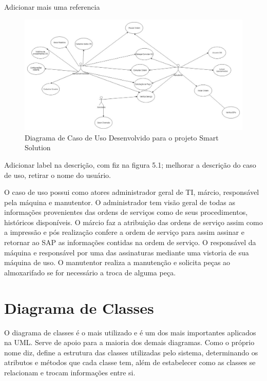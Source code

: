  {\color{red}Adicionar mais uma referencia}
 
\begin{figure}[H]
	\caption{\label{novocasodeusointegra}Diagrama de Caso de Uso Desenvolvido para o projeto Smart Solution}
	\begin{center}
		\includegraphics[scale=0.90,angle=90]{./Figuras/novocasodeusointegra}
		
	\end{center}
\end{figure}

\newpage
{\color{red}Adicionar label na descrição, com fiz na figura 5.1; melhorar a descrição do caso de uso, retirar o nome do usuário.


}

O caso de uso possui como atores administrador geral de TI, márcio, responsável pela máquina e manutentor. O administrador tem visão geral de todas as informações provenientes das ordens de serviços como de seus procedimentos, históricos disponíveis. O márcio faz a atribuição das ordens de serviço assim como a impressão e pós realização confere a ordem de serviço para assim assinar e retornar ao SAP as informações contidas na ordem de serviço. O responsável da máquina e responsável por uma das assinaturas mediante uma vistoria de sua máquina de uso. O manutentor realiza a manutenção e solicita peças ao almoxarifado se for necessário a troca de alguma peça.



\section{Diagrama de Classes}
O diagrama de classes é o mais utilizado e é um dos mais importantes aplicados na UML. Serve de apoio para a maioria dos demais diagramas. Como o próprio nome diz, define a estrutura das classes utilizadas pelo sistema, determinando os atributos e métodos que cada classe tem, além de estabelecer como as classes se relacionam e trocam informações entre si.\cite{guedes2009uml}

